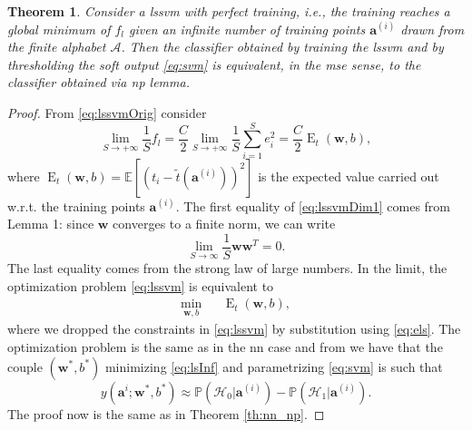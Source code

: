 \documentclass[draftcls,onecolumn,12pt]{IEEEtran}
\newcommand{\ie}{i.e., }
\newcommand{\wrt}{w.r.t. }
\newcommand{\Exp}[1]{\mathbb{E}\left[#1\right]}
\DeclareMathOperator{\E}{E}
\newtheorem{theorem}{Theorem}
\begin{document}
\begin{theorem}
	\label{th:lsnp}
	Consider a \ac{lssvm} with perfect training, \ie the training reaches a global minimum of $f_l$ given an infinite number of training points $\bm{a}^{(i)}$ drawn from the finite alphabet $\mathcal A$. Then the classifier obtained by training the \ac{lssvm} and by thresholding the soft output \eqref{eq:svm} is equivalent, in the \ac{mse} sense, to the classifier obtained via \ac{np} lemma.
\end{theorem}
\begin{proof}
	From \eqref{eq:lssvmOrig} consider
	\begin{equation}
	\label{eq:lssvmDim1}
	\lim_{S \to +\infty} \frac{1}{S} f_l =\frac{C}{2} \lim_{S \to +\infty}\frac{1}{S}  \sum_{i=1}^S e^2_i	=\frac{C}{2}\E_t(\mathbf{w},b),
	\end{equation}
	where $\E_t(\mathbf{w},b) = \Exp{\left(t_i - \tilde{t}(\mathbf{a}^{(i)})\right)^2} $ is the expected value carried out \wrt the training points $\mathbf{a}^{(i)}$. 
	The first equality of \eqref{eq:lssvmDim1} comes from Lemma 1: since $\mathbf{w}$ converges to a finite norm, we can write
	\begin{equation}
	\lim_{S\to \infty} \frac{1}{S} \mathbf{w} \mathbf{w}^T 	= 0.
	\end{equation} 
	The last equality comes from the strong law of large numbers. In the limit, the optimization problem \eqref{eq:lssvm} is equivalent to
	\begin{equation}
	\label{eq:lsInf}
	\begin{aligned}
	& \underset{\mathbf{w},b}{\text{min}} & &  \E_t(\mathbf{w},b), & 
	\end{aligned}	
	\end{equation}
	where we dropped the constraints in \eqref{eq:lssvm} by substitution using \eqref{eq:els}. The optimization problem is the same as in the \ac{nn} case and from \cite{Ruck-90} we have that the couple $(\mathbf{w}^*,b^*)$ minimizing \eqref{eq:lsInf} and parametrizing \eqref{eq:svm} is such that
	\begin{equation}
	y(\mathbf{a}^i;\mathbf{w}^*,b^*)  \approx \mathbb{P}(\mathcal{H}_0|\mathbf{a}^{(i)}) - \mathbb{P}(\mathcal{H}_1|\mathbf{a}^{(i)}).
	\end{equation}
	The proof now is the same as in Theorem \ref{th:nn_np}.
\end{proof}
\end{document}

